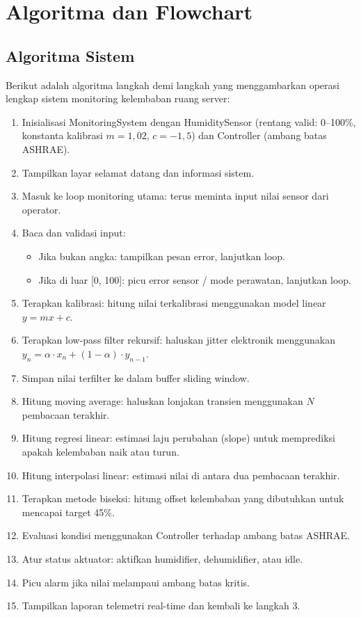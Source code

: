 \documentclass[journal]{IEEEtran}
\begin{document}
\section{Algoritma dan Flowchart}

\subsection{Algoritma Sistem}
Berikut adalah algoritma langkah demi langkah yang menggambarkan operasi lengkap sistem monitoring kelembaban ruang server:

\begin{enumerate}
  \item {Inisialisasi} {MonitoringSystem} dengan {HumiditySensor} (rentang valid: 0--100\%, konstanta kalibrasi $m=1,02$, $c=-1,5$) dan {Controller} (ambang batas ASHRAE).
  \item {Tampilkan} layar selamat datang dan informasi sistem.
  \item {Masuk ke loop monitoring utama}: terus meminta input nilai sensor dari operator.
  \item {Baca dan validasi input}:
    \begin{itemize}
      \item Jika bukan angka: tampilkan pesan error, lanjutkan loop.
      \item Jika di luar [0, 100]: picu error sensor / mode perawatan, lanjutkan loop.
    \end{itemize}
  \item {Terapkan kalibrasi}: hitung nilai terkalibrasi menggunakan model linear $y = mx + c$.
  \item {Terapkan low-pass filter rekursif}: haluskan jitter elektronik menggunakan $y_n = \alpha \cdot x_n + (1-\alpha) \cdot y_{n-1}$.
  \item {Simpan nilai terfilter} ke dalam buffer sliding window.
  \item {Hitung moving average}: haluskan lonjakan transien menggunakan $N$ pembacaan terakhir.
  \item {Hitung regresi linear}: estimasi laju perubahan (slope) untuk memprediksi apakah kelembaban naik atau turun.
  \item {Hitung interpolasi linear}: estimasi nilai di antara dua pembacaan terakhir.
  \item {Terapkan metode biseksi}: hitung offset kelembaban yang dibutuhkan untuk mencapai target 45\%.
  \item {Evaluasi kondisi} menggunakan {Controller} terhadap ambang batas ASHRAE.
  \item {Atur status aktuator}: aktifkan humidifier, dehumidifier, atau idle.
  \item {Picu alarm} jika nilai melampaui ambang batas kritis.
  \item {Tampilkan laporan telemetri real-time} dan kembali ke langkah 3.
\end{enumerate}
\end{document}
